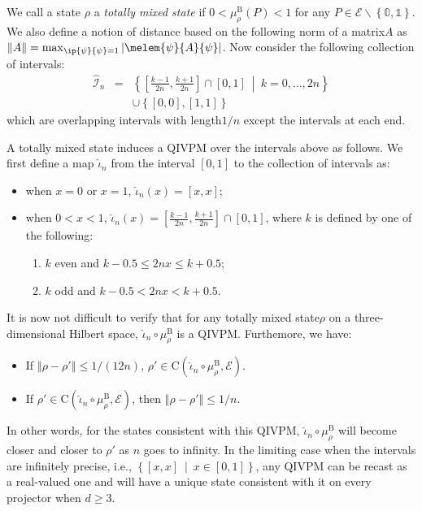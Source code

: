 \documentclass[english,reprint, aps, prl,superscriptaddress, showpacs,
showkeys, longbibliography, amsmath, amssymb]{revtex4-1}
\theoremstyle{plain}
\theoremstyle{definition}
\newcommand{\events}{\ensuremath{\mathcal{E}}}
\newcommand{\set}[2]{\ensuremath{\left\{ {#1}~\middle|~{#2}\right\} }}
\newcommand{\coreBorn}{\ensuremath{\mathrm{C}}}
\newcommand{\nb}{\nolinebreak[1] }
\begin{document}
We call a state $\rho$ a \emph{totally mixed state} if
$0<\mu_{\rho}^{\mathrm{B}}\left(P\right)<1$ for any
$P\in\events\backslash\left\{ \mathbb{0},\mathbb{1}\right\} $. We also
define a notion of distance based on the following norm of a
matrix\nb$A$ as
$\left\Vert A\right\Vert
=\max_{\ip{\psi}{\psi}=1}\left|\melem{\psi}{A}{\psi}\right|$\nb\citep{544199}. Now
consider the following collection of intervals:
\begin{eqnarray}
\widehat{\mathscr{I}}_{n} & = & \set{\left[\frac{k-1}{2n},\frac{k+1}{2n}\right]\cap\left[0,1\right]}{k=0,\ldots,2n}\nonumber \\
 &  & \cup\left\{ \left[0,0\right],\left[1,1\right]\right\} 
\end{eqnarray}
which are overlapping intervals with length\nb$1/n$ except the intervals
at each end. 

A totally mixed state induces a QIVPM over the intervals above as
follows. We first define a map $\widehat{\iota}_{n}$ from the interval
$[0,1]$ to the collection of intervals as:
\begin{itemize}
\item when $x=0$ or $x=1$, $\widehat{\iota}_{n}\left(x\right)=\left[x,x\right]$;
\item when $0<x<1$, $\widehat{\iota}_{n}\left(x\right)=\left[\frac{k-1}{2n},\frac{k+1}{2n}\right]\cap\left[0,1\right]$,
where $k$ is defined by one of the following:
\begin{enumerate}
\item $k$ even and $k-0.5\le2nx\le k+0.5$;
\item $k$ odd and $k-0.5<2nx<k+0.5$.
\end{enumerate}
\end{itemize}

It is now not difficult to verify that for any totally mixed
state\nb$\rho$ on a three-dimensional Hilbert space,
$\widehat{\iota}_{n}\circ\mu_{\rho}^{\mathrm{B}}$ is a
QIVPM. Furthemore, we have:
\begin{itemize}
\item If $\left\Vert \rho-\rho'\right\Vert \le1/\left(12n\right)$,
$\rho'\in\coreBorn\left(\widehat{\iota}_{n}\circ\mu_{\rho}^{\mathrm{B}},\events\right)$.
\item If $\rho'\in\coreBorn\left(\widehat{\iota}_{n}\circ\mu_{\rho}^{\mathrm{B}},\events\right)$,
then $\left\Vert \rho-\rho'\right\Vert \le1/n$.
\end{itemize}
In other words, for the states consistent with this QIVPM,
$\widehat{\iota}_{n}\circ\mu_{\rho}^{\mathrm{B}}$ will become closer and
closer to $\rho'$ as $n$ goes to infinity. In the limiting case when
the intervals are infinitely precise, i.e.,
$\set{\left[x,x\right]}{x\in\left[0,1\right]}$, any QIVPM can be
recast as a real-valued one and will have a unique state consistent
with it on every projector when $d\ge3$.
\end{document}
